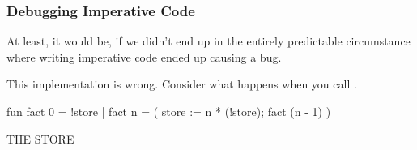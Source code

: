 \documentclass[aspectratio=169, handout]{beamer}
\begin{document}
\begin{frame}[fragile]
  \frametitle{Debugging Imperative Code}

  \begin{minipage}[t][0.6in][t]{\textwidth}
  At least, it would be, if we didn't end up in the entirely predictable
  circumstance where writing imperative code ended up causing a bug.

  \pause
  \vspace{\fill}

  This  implementation is wrong. Consider what happens when you call
  .
  \end{minipage}

  \pause
  \vspace{10pt}

  \begin{center}
    \begin{minipage}[t][1.7in][t]{0.6\textwidth}
      \vspace{\fill}
      \begin{codeblock}
        fun fact 0 = !store
          | fact n =
              ( store := n * (!store);
                fact (n - 1)
              )
      \end{codeblock}
      \vspace{\fill}
    \end{minipage}
    \hfill\vline\hfill
    \begin{minipage}[t][1.7in][t]{0.3\textwidth}
      \centering
      {\hspace{-20pt}\color{gray} \large THE STORE}

      \vspace{\fill}
      \vspace{\fill}
    \end{minipage}
  \end{center}
\end{frame}
\end{document}
